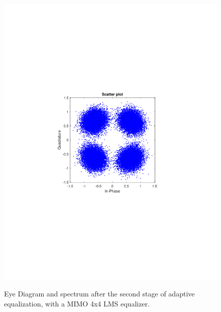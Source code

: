 \begin{refsection}
\begin{figure}[H]
\begin{minipage}{0.30\textwidth}
		\includegraphics[clip, trim=4cm 8cm 4cm 8cm, width=1\textwidth]{./sdf/m_qam_system/figures/expResults/homodyne/5_const_4GBdInSig13dB_AfMIMO2.pdf}
		\label{fig:4GBdSpecBefFec}
	\end{minipage}
	\caption{Eye Diagram and spectrum after the second stage of adaptive equalization, with a MIMO 4x4 LMS equalizer.}
\end{figure}


\end{refsection}
